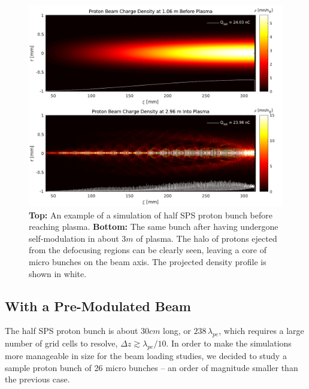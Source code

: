 \begin{figure}[hbt]
    \centering
    \includegraphics[width=1.0\linewidth]{figures/PBSelfModulationBefAft}
    \caption{\label{Fig:Sim:SMI}
        \textbf{Top:} An example of a simulation of half SPS proton bunch before reaching plasma.
        \textbf{Bottom:} The same bunch after having undergone self-modulation in about $3\unit{m}$ of plasma.
        The halo of protons ejected from the defocusing regions can be clearly seen, leaving a core of micro bunches on the beam axis.
        The projected density profile is shown in white.
    }
\end{figure}


\subsection{With a Pre-Modulated Beam}
\label{Sim:PBPreMod}

The half SPS proton bunch is about $30\unit{cm}$ long, or $238\,\lambda_{pe}$, which requires a large number of grid cells to resolve, $\Delta z \gtrsim \lambda_{pe}/10$.
In order to make the simulations more manageable in size for the beam loading studies, we decided to study a sample proton bunch of 26 micro bunches -- an order of magnitude smaller than the previous case.

